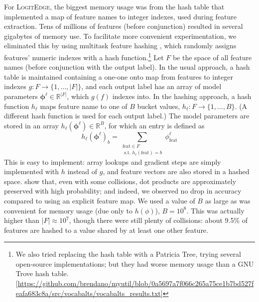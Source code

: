 \documentclass[11pt]{article}
\newcommand{\codenote}[1]{\textcolor{PineGreen}{[#1]}}
\newcommand{\logitedge}{\textsc{LogitEdge}}
\begin{document}
\noindent
For \logitedge, the biggest memory usage was from
the hash table that implemented
a map of feature names to integer indexes, used during feature extraction.
Tens of millions of features (before conjunction) resulted in several gigabytes of memory use.  To facilitate more convenient experimentation,
we eliminated this by using
multitask feature hashing
\cite{weinberger_feature_2009},
which randomly assigns features' numeric indexes with a hash function.\footnote{We also tried replacing the hash table with a Patricia Tree, trying several open-source implementations; but they had worse memory usage than a GNU Trove hash table. 
  \codenote{\url{https://github.com/brendano/myutil/blob/0a5697a7f066c265a75ce1b7bd527feafa683c8a/src/vocabalts/vocabalts_results.txt}}}
Let $F$ be the space of all feature names (before conjunction with the output label).
In the usual approach, a hash table is maintained containing a
one-one onto map from features to integer indexes $g: F \rightarrow \{1,\ldots,|F|\}$,
and each output label has an array of model parameters $\bm\phi^\ell \in \mathbb{R}^{|F|}$,
which $g(f)$ indexes into.
In the hashing approach, a hash function $h_{\ell}$
maps feature name to one of $B$ bucket values,
$h_{\ell} : F \rightarrow \{1, \ldots, B\}$.
(A different hash function is used for each output label.)
The model parameters are stored in an array $h_\ell(\bm\phi^\ell) \in \mathbb{R}^{B}$,
for which an entry is defined as
\[
  h_\ell(\bm\phi^\ell)_{b} = 
  \sum_{\substack{\text{feat} \in F 
    \\\text{ s.t. } h_\ell(\text{feat})=b}}
  {\phi^\ell_{\text{feat}}}
\]
This is easy to implement:
array lookups and gradient steps are simply implemented with $h$ instead of $g$, and feature vectors are also stored in a hashed space.
\cite{weinberger_feature_2009} show that, even with some collisions,
dot products are approximately preserved with high probability;
and indeed, we observed no drop in accuracy compared to using an explicit feature map.
We used a value of $B$ as large as was convenient for memory usage (due only to $h(\phi)$), $B=10^{8}$.
This was actually higher than $|F|\approx 10^7$, though there were still plenty of collisions: about 9.5\% of features are hashed to a value shared by at least one other feature.

\end{document}
